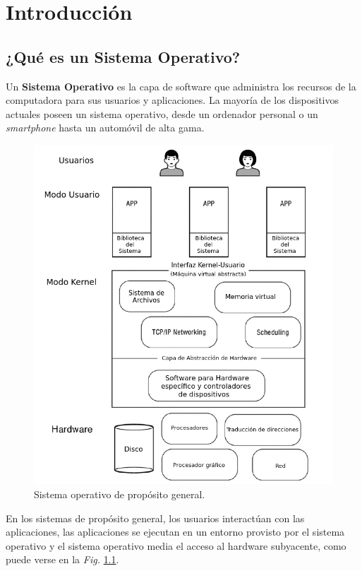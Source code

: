 \documentclass[10pt]{book}
\begin{document}
\chapter{Introducción}

\section{¿Qué es un Sistema Operativo?}
Un \textbf{Sistema Operativo} es la capa de software que administra los recursos de la computadora para sus usuarios y aplicaciones. La mayoría de los dispositivos actuales poseen un sistema operativo, desde un ordenador personal o un \textit{smartphone} hasta un automóvil de alta gama.

\begin{figure}[tbhp]
\centerline{\includegraphics[scale=0.70]{img/fig0101}}
\caption{Sistema operativo de propósito general.}
\label{fig0101}
\end{figure}

En los sistemas de propósito general, los usuarios interactúan con las aplicaciones, las aplicaciones se ejecutan en un entorno provisto por el sistema operativo y el sistema operativo media el acceso al hardware subyacente, como puede verse en la \textit{Fig.} \ref{fig0101}.
\end{document}
